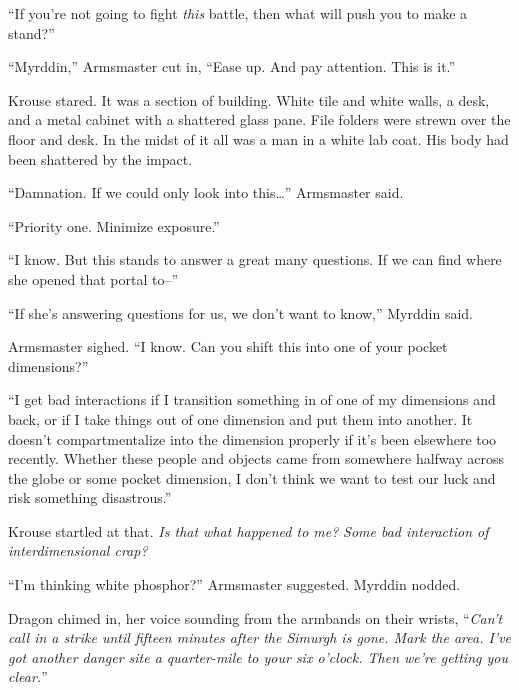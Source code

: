 ``If you're not going to fight \emph{this} battle, then what will push you to make a stand?''



``Myrddin,'' Armsmaster cut in, ``Ease up.  And pay attention.  This is it.''



Krouse stared.  It was a section of building.  White tile and white walls, a desk, and a metal cabinet with a shattered glass pane.  File folders were strewn over the floor and desk.  In the midst of it all was a man in a white lab coat.  His body had been shattered by the impact.



``Damnation.  If we could only look into this\ldots'' Armsmaster said.



``Priority one.  Minimize exposure.''



``I know.  But this stands to answer a great many questions.  If we can find where she opened that portal to--''



``If she's answering questions for us, we don't want to know,'' Myrddin said.



Armsmaster sighed.  ``I know.  Can you shift this into one of your pocket dimensions?''



``I get bad interactions if I transition something in of one of my dimensions and back, or if I take things out of one dimension and put them into another.  It doesn't compartmentalize into the dimension properly if it's been elsewhere too recently.  Whether these people and objects came from somewhere halfway across the globe or some pocket dimension, I don't think we want to test our luck and risk something disastrous.''



Krouse startled at that.  \emph{Is that what happened to me?  }\emph{Some bad interaction of interdimensional crap?}



``I'm thinking white phosphor?''  Armsmaster suggested.  Myrddin nodded.



Dragon chimed in, her voice sounding from the armbands on their wrists, ``\emph{Can't call in a strike until fifteen minutes after the Simurgh is gone.  Mark the area.  I've got another danger site a quarter-mile to your six o'clock.  Then we're getting you clear.}''



